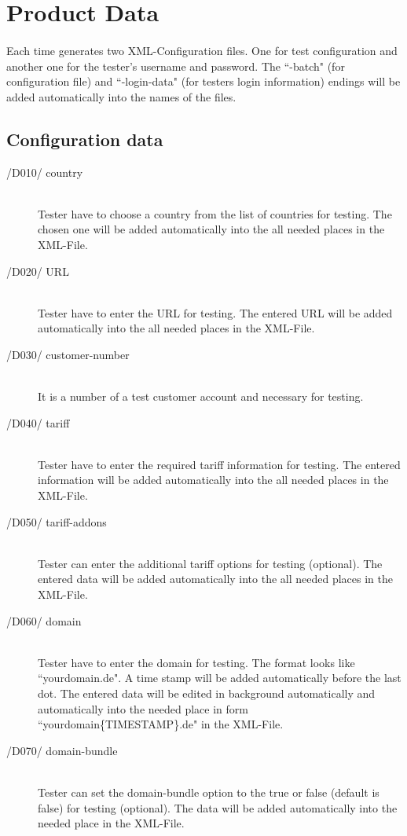\section{Product Data}
\paragraph{}Each time \app{} generates two XML-Configuration files. One for test configuration and another one for the tester's username and password. The ``-batch" (for configuration file) and ``-login-data" (for testers login information) endings will be added automatically into the names of the files.

\subsection{Configuration data}
\begin{description}
\item[/D010/ country]\hfill \\ Tester have to choose a country from the list of countries for testing. The chosen one will be added automatically into the all needed places in the XML-File.
\item[/D020/ URL]\hfill \\ Tester have to enter the URL for testing. The entered URL will be added automatically into the all needed places in the XML-File.
\item[/D030/ customer-number]\hfill \\ It is a number of a test customer account and necessary for testing.
\item[/D040/ tariff]\hfill \\ Tester have to enter the required tariff information for testing. The entered information will be added automatically into the all needed places in the XML-File.
\item[/D050/ tariff-addons]\hfill \\ Tester can enter the additional tariff options for testing (optional). The entered data will be added automatically into the all needed places in the XML-File.
\item[/D060/ domain]\hfill \\ Tester have to enter the domain for testing. The format looks like ``yourdomain.de". A time stamp will be added automatically before the last dot. The entered data will be edited in background automatically and automatically into the needed place in form ``yourdomain\{TIMESTAMP\}.de"  in the XML-File.
\item[/D070/ domain-bundle]\hfill \\ Tester can set the domain-bundle option to the true or false (default is false) for testing (optional). The data will be added automatically into the needed place in the XML-File.
\end{description}

